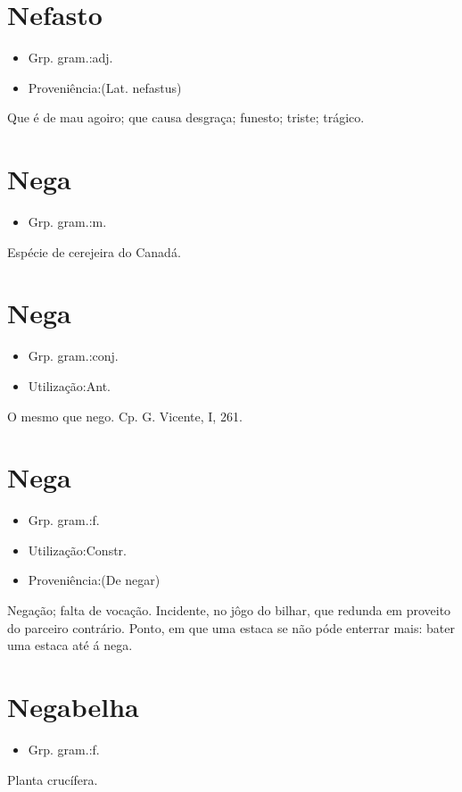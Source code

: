 \section{Nefasto}
\begin{itemize}
\item {Grp. gram.:adj.}
\end{itemize}
\begin{itemize}
\item {Proveniência:(Lat. \textunderscore nefastus\textunderscore )}
\end{itemize}
Que é de mau agoiro; que causa desgraça; funesto; triste; trágico.
\section{Nega}
\begin{itemize}
\item {Grp. gram.:m.}
\end{itemize}
Espécie de cerejeira do Canadá.
\section{Nega}
\begin{itemize}
\item {Grp. gram.:conj.}
\end{itemize}
\begin{itemize}
\item {Utilização:Ant.}
\end{itemize}
O mesmo que \textunderscore nego\textunderscore . Cp. G. Vicente, I, 261.
\section{Nega}
\begin{itemize}
\item {Grp. gram.:f.}
\end{itemize}
\begin{itemize}
\item {Utilização:Constr.}
\end{itemize}
\begin{itemize}
\item {Proveniência:(De \textunderscore negar\textunderscore )}
\end{itemize}
Negação; falta de vocação.
Incidente, no jôgo do bilhar, que redunda em proveito do parceiro contrário.
Ponto, em que uma estaca se não póde enterrar mais: \textunderscore bater uma estaca até á nega\textunderscore .
\section{Negabelha}
\begin{itemize}
\item {Grp. gram.:f.}
\end{itemize}
Planta crucífera.
